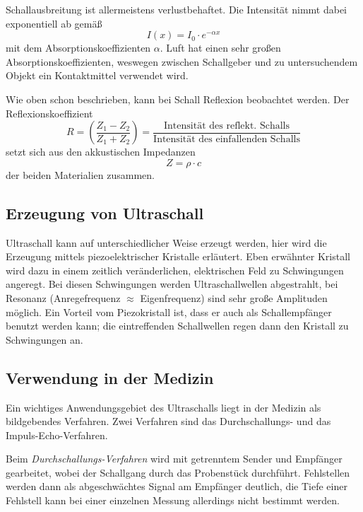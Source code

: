 \noindent
Schallausbreitung ist allermeistens verlustbehaftet. Die Intensität nimmt dabei exponentiell ab gemäß
\begin{equation}
	\label{eqn:daempfung}
	I(x) = I_0 \cdot e^{-\alpha x}
\end{equation}
mit dem Absorptionskoeffizienten $\alpha$. Luft hat einen sehr großen Absorptionskoeffizienten, weswegen 
zwischen Schallgeber und zu untersuchendem Objekt ein Kontaktmittel verwendet wird.

\noindent
Wie oben schon beschrieben, kann bei Schall Reflexion beobachtet werden. Der Reflexionskoeffizient
\begin{equation}
	R = \left(\frac{Z_1 - Z_2}{Z_1 + Z_2} \right) 
	= \frac{\text{Intensität des reflekt. Schalls}}{\text{Intensität des einfallenden Schalls}}
\end{equation}
setzt sich aus den akkustischen Impedanzen 
\begin{equation}
	\label{eqn:impedanz}
	Z = \rho \cdot c
\end{equation}
der beiden Materialien zusammen.

\subsection{Erzeugung von Ultraschall}
\label{sec:Erzeugung von Ultraschall}

Ultraschall kann auf unterschiedlicher Weise erzeugt werden, hier wird die Erzeugung mittels
piezoelektrischer Kristalle erläutert. Eben erwähnter Kristall wird dazu in einem zeitlich
veränderlichen, elektrischen Feld zu Schwingungen angeregt. Bei diesen Schwingungen werden
Ultraschallwellen abgestrahlt, bei Resonanz (Anregefrequenz $\approx$ Eigenfrequenz) sind
sehr große Amplituden möglich.  Ein Vorteil vom Piezokristall ist, dass er auch als Schallempfänger
benutzt werden kann; die eintreffenden Schallwellen regen dann den Kristall zu Schwingungen an.

\subsection{Verwendung in der Medizin}
\label{sec:Verwendung in der Medizin}

Ein wichtiges Anwendungsgebiet des Ultraschalls liegt in der Medizin als bildgebendes Verfahren.
Zwei Verfahren sind das Durchschallungs- und das Impuls-Echo-Verfahren.

Beim \textit{Durchschallungs-Verfahren} wird mit getrenntem Sender und Empfänger gearbeitet, wobei der
Schallgang durch das Probenstück durchführt. Fehlstellen werden dann als abgeschwächtes Signal am
Empfänger deutlich, die Tiefe einer Fehlstell kann bei einer einzelnen Messung allerdings nicht
bestimmt werden.

